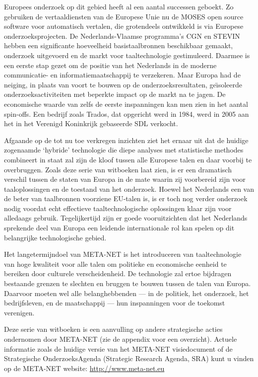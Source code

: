 \documentclass[]{../../metanetpaper}
\begin{document}
\begin{multicols}{2}
    Europees onderzoek op dit gebied heeft al een aantal successen geboekt. Zo gebruiken de vertaaldiensten van de Europese Unie nu de MOSES open source software voor automatisch vertalen, die grotendeels ontwikkeld is via Europese onderzoeksprojecten. De Nederlands-Vlaamse programma's CGN en STEVIN hebben een significante hoeveelheid basistaalbronnen beschikbaar gemaakt, onderzoek uitgevoerd en de markt voor taaltechnologie gestimuleerd. Daarmee is een eerste stap gezet om de positie van het Nederlands in de moderne communicatie- en informatiemaatschappij te verzekeren. Maar Europa had de neiging, in plaats van voort te bouwen op de onderzoeksresultaten, ge{\"\i}soleerde onderzoeksactiviteiten met beperkte impact op de markt na te jagen. De economische waarde  van zelfs de eerste inspanningen kan men zien in het aantal spin-offs. Een bedrijf zoals Trados, dat opgericht werd in 1984, werd in 2005 aan het in het Verenigd Koninkrijk gebaseerde SDL verkocht.


    Afgaande op de tot nu toe verkregen inzichten ziet het ernaar uit dat de huidige zogenaamde `hybride' technologie die diepe analyses met statistische methodes combineert in staat zal zijn de kloof tussen alle Europese talen en daar voorbij te overbruggen. Zoals deze serie van witboeken laat zien, is er een dramatisch verschil tussen de staten van Europa in de mate waarin zij voorbereid zijn voor taaloplossingen en de toestand van het onderzoek. Hoewel het Nederlands een van de beter van taalbronnen voorziene EU-talen is, is er toch nog verder onderzoek nodig voordat echt effectieve taaltechnologische oplossingen klaar zijn voor alledaags gebruik. Tegelijkertijd zijn er goede vooruitzichten dat het Nederlands sprekende deel van Europa een leidende internationale rol kan spelen op dit belangrijke technologische gebied.

    Het langetermijndoel van META-NET is het introduceren van taaltechnologie van hoge kwaliteit voor alle talen om politieke en economische eenheid te bereiken door culturele verscheidenheid. De technologie zal ertoe bijdragen bestaande grenzen te slechten en bruggen te bouwen tussen de talen van Europa. Daarvoor moeten wel alle belanghebbenden --- in de politiek, het onderzoek, het bedrijfsleven, en de maatschappij --- hun inspanningen voor de toekomst verenigen.

    Deze serie van witboeken is een aanvulling op andere strategische acties ondernomen door META-NET (zie de appendix voor een overzicht). Actuele informatie zoals de huidige versie van het META-NET visiedocument \cite{MNVision}  of de Strategische OnderzoeksAgenda (Strategic Research Agenda, SRA) kunt u vinden op de META-NET website: \url{http://www.meta-net.eu}
\end{multicols}
\end{document}
